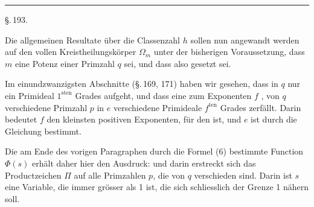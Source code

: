 
\begin{center}


\rule{4em}{0.4pt}
\end{center}

\begin{center}
\S.\,193.

\end{center}

Die allgemeinen Resultate über die Classenzahl $h$ sollen
nun angewandt werden auf den vollen Kreistheilungskörper $\Omega_m$
unter der bisherigen Voraussetzung, dass $m$ eine Potenz einer
Primzahl $q$ sei, und dass also
gesetzt sei.

Im einundzwanzigsten Abschnitte (\S.\,169, 171) haben wir
gesehen, dass in $q$ nur ein Primideal $1^{\text{sten}}$ Grades aufgeht, und
dass eine zum Exponenten $f$ , von $q$ verschiedene
Primzahl $p$ in $e$ verschiedene Primideale $f^{\text{ten}}$ Grades zerfällt.
Darin bedeutet $f$ den kleinsten positiven Exponenten, für den
ist, und $e$ ist durch die Gleichung
bestimmt.

Die am Ende des vorigen Paragraphen durch die Formel (6)
bestimmte Function $\varPhi(s)$ erhält daher hier den Ausdruck:
und darin erstreckt sich das Productzeichen $\varPi$ auf alle Primzahlen
 $p$, die von $q$ verschieden sind. Darin ist $s$ eine Variable,
die immer grösser als 1 ist, die sich schliesslich der Grenze 1
nähern soll.
